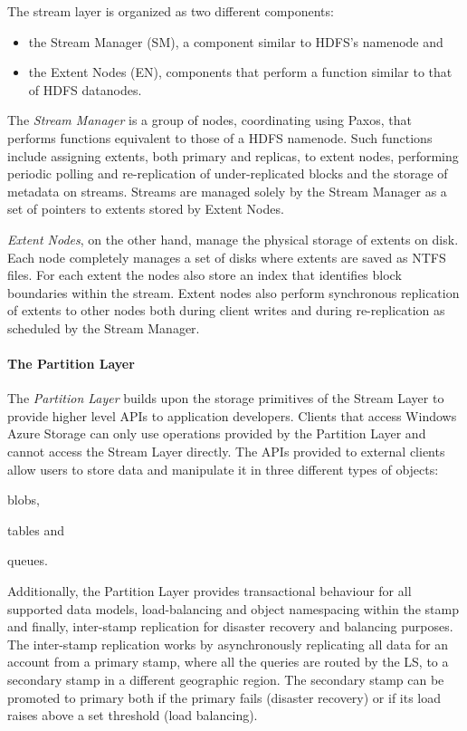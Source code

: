 The stream layer is organized as two different components:
\begin{itemize}
    \item the Stream Manager (SM), a component similar to HDFS's namenode and
    \item the Extent Nodes (EN), components that perform a function similar to that of HDFS datanodes.
\end{itemize}

The \emph{Stream Manager} is a group of nodes, coordinating using Paxos, that performs functions equivalent to those of a HDFS namenode.
Such functions include assigning extents, both primary and replicas, to extent nodes, performing periodic polling and re-replication of under-replicated blocks and the storage of metadata on streams.
Streams are managed solely by the Stream Manager as a set of pointers to extents stored by Extent Nodes.

\emph{Extent Nodes}, on the other hand, manage the physical storage of extents on disk.
Each node completely manages a set of disks where extents are saved as NTFS files.
For each extent the nodes also store an index that identifies block boundaries within the stream.
Extent nodes also perform synchronous replication of extents to other nodes both during client writes and during re-replication as scheduled by the Stream Manager.

\paragraph{The Partition Layer}

The \emph{Partition Layer} builds upon the storage primitives of the Stream Layer to provide higher level APIs to application developers.
Clients that access Windows Azure Storage can only use operations provided by the Partition Layer and cannot access the Stream Layer directly.
The APIs provided to external clients allow users to store data and manipulate it in three different types of objects:
\begin{inparaenum}[i)]
    \item blobs,
    \item tables and
    \item queues.
\end{inparaenum}
Additionally, the Partition Layer provides transactional behaviour for all supported data models, load-balancing and object namespacing within the stamp and finally, inter-stamp replication for disaster recovery and balancing purposes.
The inter-stamp replication works by asynchronously replicating all data for an account from a primary stamp, where all the queries are routed by the LS, to a secondary stamp in a different geographic region.
The secondary stamp can be promoted to primary both if the primary fails (disaster recovery) or if its load raises above a set threshold (load balancing).

